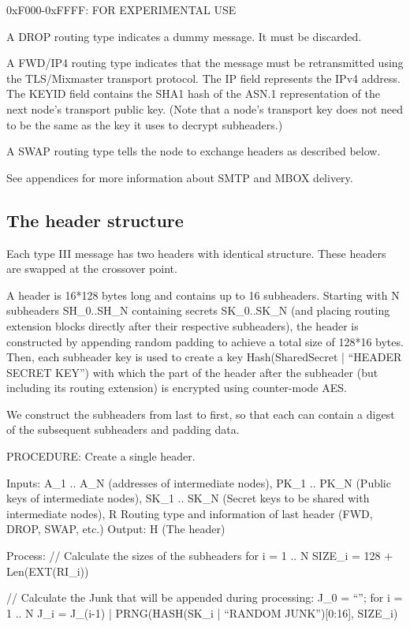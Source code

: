 0xF000-0xFFFF: FOR EXPERIMENTAL USE

A DROP routing type indicates a dummy message. It must be discarded.

A FWD/IP4 routing type indicates that the message must be
retransmitted using the TLS/Mixmaster transport protocol. The IP field
represents the IPv4 address.  The KEYID field contains the SHA1 hash
of the ASN.1 representation of the next node's transport public key.
(Note that a node's transport key does not need to be the same as the
key it uses to decrypt subheaders.)

A SWAP routing type tells the node to exchange headers as described below.

See appendices for more information about SMTP and MBOX delivery.

\subsection{The header structure}

Each type III message has two headers with identical structure. These
headers are swapped at the crossover point.

A header is 16*128 bytes long and contains up to 16
subheaders. Starting with N subheaders SH_0..SH_N containing secrets
SK_0..SK_N (and placing routing extension blocks directly after their
respective subheaders), the header is constructed by appending 
random padding to achieve a total size
of 128*16 bytes. Then, each subheader key is used to create a key
Hash(SharedSecret | ``HEADER SECRET KEY'') with which the part of the
header after the subheader (but including its routing extension) is
encrypted using counter-mode AES.

We construct the subheaders from last to first, so that each can contain
a digest of the subsequent subheaders and padding data.

PROCEDURE: Create a single header.

Inputs: A_1 .. A_N (addresses of intermediate nodes), 
	PK_1 .. PK_N (Public keys of intermediate nodes),
	SK_1 .. SK_N (Secret keys to be shared with intermediate nodes),
        R Routing type and information of last header (FWD, DROP, SWAP, etc.)
Output: H (The header)

Process: 
  // Calculate the sizes of the subheaders
  for i = 1 .. N
	SIZE_i = 128 + Len(EXT(RI_i))

  // Calculate the Junk that will be appended during processing:
  J_0 = ``'';
  for i = 1 .. N
	J_i = J_(i-1) | PRNG(HASH(SK_i | ``RANDOM JUNK'')[0:16], SIZE_i)


